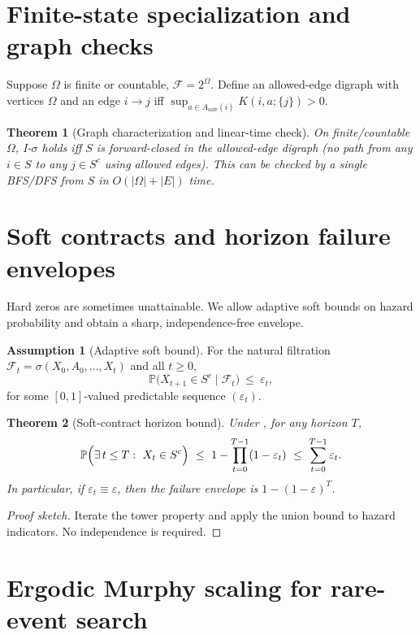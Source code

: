 \documentclass[11pt]{article}
\theoremstyle{plain}
\newtheorem{theorem}{Theorem}
\theoremstyle{definition}
\newtheorem{assumption}{Assumption}
\theoremstyle{remark}
\newcommand{\Prb}{\mathbb{P}}
\newcommand{\F}{\mathcal{F}}
\begin{document}
\section{Finite-state specialization and graph checks}

Suppose $\Omega$ is finite or countable, $\F=2^\Omega$. Define an allowed-edge digraph with vertices $\Omega$ and an edge $i\to j$ iff $\sup_{a\in A_{\mathrm{safe}}(i)} K(i,a;\{j\})>0$.

\begin{theorem}[Graph characterization and linear-time check]
\label{thm:graph}
On finite/countable $\Omega$, I-$\sigma$ holds iff $S$ is forward-closed in the allowed-edge digraph (no path from any $i\in S$ to any $j\in S^c$ using allowed edges). This can be checked by a single BFS/DFS from $S$ in $O(|\Omega|+|E|)$ time.
\end{theorem}

\section{Soft contracts and horizon failure envelopes}

Hard zeros are sometimes unattainable. We allow adaptive soft bounds on hazard probability and obtain a sharp, independence-free envelope.

\begin{assumption}[Adaptive soft bound]
\label{ass:soft}
For the natural filtration $\mathcal{F}_t=\sigma(X_0,A_0,\dots,X_t)$ and all $t\ge 0$,
\[
\Prb\bigl(X_{t+1}\in S^c \mid \mathcal{F}_t\bigr)\ \le\ \varepsilon_t,
\]
for some $[0,1]$-valued predictable sequence $(\varepsilon_t)$.
\end{assumption}

\begin{theorem}[Soft-contract horizon bound]
\label{thm:soft}
Under , for any horizon $T$,
\[
\Prb\Bigl(\exists\,t\le T:\ X_t\in S^c\Bigr)\ \le\ 1-\prod_{t=0}^{T-1} (1-\varepsilon_t)\ \le\ \sum_{t=0}^{T-1}\varepsilon_t.
\]
In particular, if $\varepsilon_t\equiv \varepsilon$, then the failure envelope is $1-(1-\varepsilon)^T$.
\end{theorem}

\begin{proof}[Proof sketch]
Iterate the tower property and apply the union bound to hazard indicators. No independence is required. \qedhere
\end{proof}

\section{Ergodic Murphy scaling for rare-event search}
\end{document}
